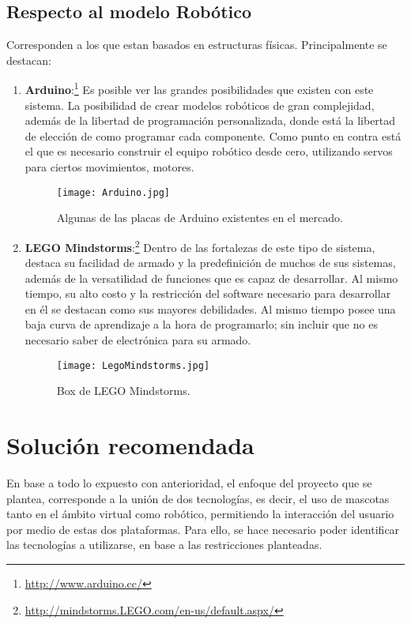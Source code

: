 \subsection{Respecto al modelo Rob\'otico}
 Corresponden a los que estan basados en estructuras f\'isicas. Principalmente se destacan:
  \begin{enumerate}
  \item {\bf Arduino}:\footnote{\url{http://www.arduino.cc/}} Es posible ver las grandes posibilidades que existen con este sistema. La posibilidad de crear modelos rob\'oticos de gran complejidad, adem\'as de la libertad de programaci\'on personalizada, donde est\'a la libertad de elecci\'on de como programar cada componente. Como punto en contra est\'a el que es necesario construir el equipo rob\'otico desde cero, utilizando servos para ciertos movimientos, motores.
\begin{figure}[H]
  \centering
  \texttt{[image: Arduino.jpg]}
  \caption[~Placas de Arduino]{Algunas de las placas de Arduino existentes en el mercado.}
  \label{fig:LegoMindstorms}
\end{figure}

  \item {\bf LEGO Mindstorms}:\footnote{\url{http://mindstorms.LEGO.com/en-us/default.aspx/}} Dentro de las fortalezas de este tipo de sistema, destaca su facilidad de armado y la predefinici\'on de muchos de sus sistemas, adem\'as de la versatilidad de funciones que es capaz de desarrollar. Al mismo tiempo, su alto costo y la restricci\'on del software necesario para desarrollar en \'el se destacan como sus mayores debilidades. Al mismo tiempo posee una baja curva de aprendizaje a la hora de programarlo; sin incluir que no es necesario saber de electr\'onica para su armado.
\begin{figure}[H]
  \centering
  \texttt{[image: LegoMindstorms.jpg]}
  \caption[~LEGO Mindstorms]{Box de LEGO Mindstorms.}
  \label{fig:LegoMindstorms}
\end{figure}

  \end{enumerate}

\newpage
\section{Soluci\'on recomendada}

En base a todo lo expuesto con anterioridad, el enfoque del proyecto que se plantea, co\-rres\-pon\-de a la uni\'on de dos tecnolog\'ias, es decir, el uso de mascotas tanto en el \'ambito virtual como rob\'otico, permitiendo la interacci\'on del usuario por medio de estas dos plataformas. Para ello, se hace necesario poder identificar las tecnolog\'ias a utilizarse, en base a las restricciones planteadas.


